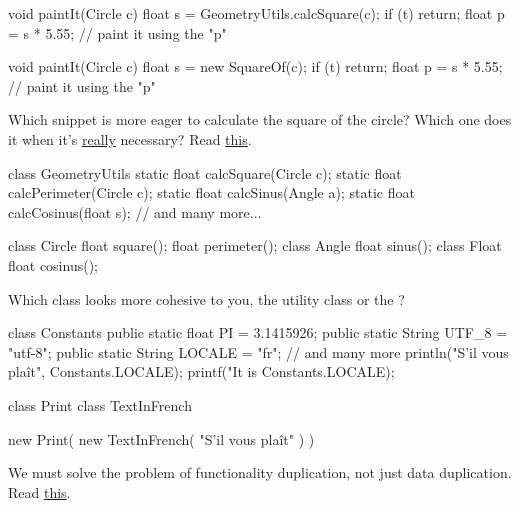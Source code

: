 \documentclass{article}
\begin{document}
\begin{pptWide}{2}
{\small\begin{ffcode}
void paintIt(Circle c) {
  float s = GeometryUtils.calcSquare(c);
  if (t) { return; }
  float p = s * 5.55;
  // paint it using the "p"
}
\end{ffcode}
}
\par\columnbreak\par
{\small\begin{ffcode}
void paintIt(Circle c) {
  float s = new SquareOf(c);
  if (t) { return; }
  float p = s * 5.55;
  // paint it using the "p"
}
\end{ffcode}
}
\end{pptWide}
\par
Which snippet is more eager to calculate the square of the circle? Which one does it when it's \ul{really} necessary?
Read \href{https://www.yegor256.com/2015/02/26/composable-decorators.html}{this}.
\plush{}

\begin{pptWide}{2}
{\small\begin{ffcode}
class GeometryUtils {
  static float calcSquare(Circle c);
  static float calcPerimeter(Circle c);
  static float calcSinus(Angle a);
  static float calcCosinus(float s);
  // and many more...
}
\end{ffcode}
}
\par\columnbreak\par
{\small\begin{ffcode}
class Circle {
  float square();
  float perimeter();
}
class Angle {
  float sinus();
}
class Float {
  float cosinus();
}
\end{ffcode}
}
\end{pptWide}
\par
Which class looks more cohesive to you, the utility class  or the ?
\plush{}


\begin{pptWide}{2}
{\small\begin{ffcode}
class Constants {
  public static float PI = 3.1415926;
  public static String UTF_8 = "utf-8";
  public static String LOCALE = "fr";
  // and many more
}
println("S'il vous plaît",
  Constants.LOCALE);
printf("It is %
  Constants.LOCALE);
\end{ffcode}
}
\par\columnbreak\par
{\small\begin{ffcode}
class Print { }
class TextInFrench { }

new Print(
  new TextInFrench(
    "S'il vous plaît"
  )
)
\end{ffcode}
}
\end{pptWide}
\par
We must solve the problem of functionality duplication, not just data duplication.
Read \href{https://www.yegor256.com/2015/07/06/public-static-literals.html}{this}.
\plush{}
\end{document}

